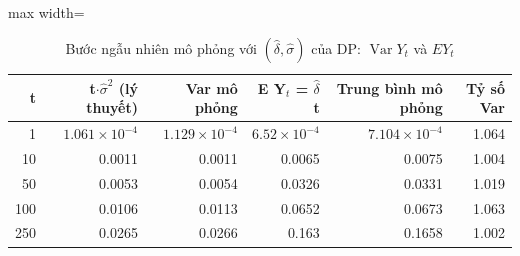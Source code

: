 \begin{table}[H]
\centering\footnotesize
\caption{Bước ngẫu nhiên mô phỏng với $(\hat\delta,\hat\sigma)$ của DP: $\operatorname{Var}Y_t$ và $EY_t$}\label{tab:tab_b12_02_rw_variance}
\begin{adjustbox}{max width=\linewidth}
\begin{tabular}{|r|r|r|r|r|r|}
\toprule
t & t$\cdot\hat{\sigma}^{2}$ (lý thuyết) & Var mô phỏng & E Y$_{t}$ = $\hat{\delta}$t & Trung bình mô phỏng & Tỷ số Var \\
\midrule
1 & $1.061\times10^{-4}$ & $1.129\times10^{-4}$ & $6.52\times10^{-4}$ & $7.104\times10^{-4}$ & 1.064 \\
10 & 0.0011 & 0.0011 & 0.0065 & 0.0075 & 1.004 \\
50 & 0.0053 & 0.0054 & 0.0326 & 0.0331 & 1.019 \\
100 & 0.0106 & 0.0113 & 0.0652 & 0.0673 & 1.063 \\
250 & 0.0265 & 0.0266 & 0.163 & 0.1658 & 1.002 \\
\bottomrule
\end{tabular}
\end{adjustbox}\par{}
\end{table}
